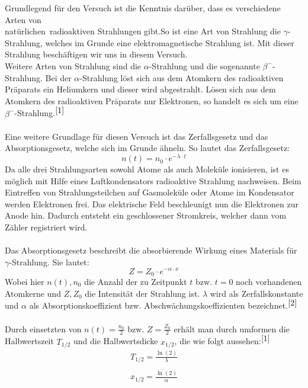 \documentclass[fontsize=12pt]{scrartcl}
\begin{document}
Grundlegend für den Versuch ist die Kenntnis darüber, dass es verschiedene Arten von \\
\glqq natürlichen\grqq~radioaktiven Strahlungen gibt.So ist eine Art von Strahlung die $\gamma$-Strahlung, welches im Grunde eine elektromagnetische 
Strahlung ist. Mit dieser Strahlung beschäftigen wir uns in diesem Versuch. \\
Weitere Arten von Strahlung sind die $\alpha$-Strahlung und die sogenannte $\beta^{-}$-Strahlung. Bei der $\alpha$-Strahlung löst sich aus dem Atomkern des radioaktiven Präparats ein 
Heliumkern und dieser wird abgestrahlt. Lösen sich aus dem Atomkern des radioaktiven Präparats nur Elektronen, so handelt es sich um eine $\beta^{-}$-Strahlung.$^{\cite{1}}$\\
~\\
Eine weitere Grundlage für diesen Versuch ist das Zerfallsgesetz und das Absorptionsgesetz, welche sich im Grunde ähneln.
So lautet das Zerfallsgesetz:
\begin{equation*}
n(t) = n_0\cdot e^{-\lambda \cdot t} 
\end{equation*}
Da alle drei Strahlungsarten sowohl Atome als auch Moleküle ionisieren, ist es möglich mit Hilfe eines Luftkondensators radioaktive Strahlung nachweisen.
Beim Eintreffen von Strahlungsteilchen auf Gasmoleküle oder Atome im Kondensator werden Elektronen frei.
Das elektrische Feld beschleunigt nun die Elektronen zur Anode hin. Dadurch entsteht ein geschlossener Stromkreis, welcher dann vom Zähler registriert wird.\\
~\\
Das Absorptionsgesetz beschreibt die absorbierende Wirkung eines Materials für $\gamma$-Strahlung. Sie lautet:
\begin{equation*}
Z = Z_0\cdot e^{-\alpha \cdot x} 
\end{equation*}
Wobei hier $n(t),n_0$ die Anzahl der zu Zeitpunkt $t$ bzw. $t=0$ noch vorhandenen Atomkerne und $Z,Z_0$ die Intensität der Strahlung ist.
$\lambda$ wird als Zerfallskonstante und $\alpha$ als Absorptionskoeffizient bzw. Abschwächungskoeffizienten bezeichnet.$^{\cite{2}}$ \\
~\\
Durch einsetzten von $n(t)=\frac{n_0}{2}$ bzw. $Z=\frac{Z_0}{2}$ erhält man durch umformen die Halbwertszeit $T_{1/2}$ und die Halbwertsdicke 
$x_{1/2}$, die wie folgt aussehen:$^{\cite{1}}$
\begin{align*}
T_{1/2} = \frac{\ln(2)}{\lambda} \\
~\\
x_{1/2} = \frac{\ln(2)}{\alpha}
\end{align*}
\newpage
\end{document}
